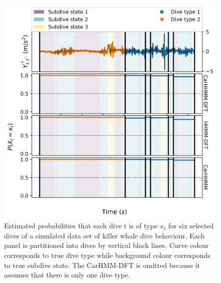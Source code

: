 \begin{figure}[ht]
    \centering
    \includegraphics[width=4.5in]{../Plots/Posterior_Coarse_States.png}
    \caption{Estimated probabilities that each dive $t$ is of type $x_t$ for six selected dives of a simulated data set of killer whale dive behaviour. Each panel is partitioned into dives by vertical black lines. Curve colour corresponds to true dive type while background colour corresponds to true subdive state. The CarHMM-DFT is omitted because it assumes that there is only one dive type.}
    \label{fig:acc_coarse}
\end{figure}

